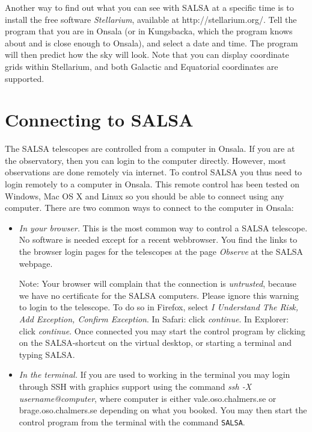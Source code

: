 Another way to find out what you can see with SALSA at a specific time is to
install the free software \emph{Stellarium}, available at
http://stellarium.org/.  Tell the program that you are in Onsala (or in
Kungsbacka, which the program knows about and is close enough to Onsala), and
select a date and time.  The program will then predict how the sky will look.
Note that you can display coordinate grids within Stellarium, and both Galactic
and Equatorial coordinates are supported.

\section{Connecting to SALSA} 
\label{sect:connect}
The SALSA telescopes are controlled from a computer in Onsala. If you are at
the observatory, then you can login to the computer directly. However, most
observations are done remotely via internet. To control SALSA you thus need to
login remotely to a computer in Onsala. This remote control has been tested
on Windows, Mac OS X and Linux so you should be able to connect using any 
computer. There are two common ways to connect to the computer in Onsala:

\begin{itemize}
	\item{\emph{In your browser.} This is the most common way to control a
			SALSA telescope. No software is needed except for a recent 
			webbrowser. You find the links to the browser login pages for
			the telescopes at the page \emph{Observe} at the SALSA webpage.
			
		Note: Your browser will complain that the connection is \emph{untrusted},
			because we have no certificate for the SALSA computers. Please
			ignore this warning to login to the telescope. To do so in Firefox,
			select \emph{I Understand The Risk, Add Exception, Confirm
			Exception}. In Safari: click \emph{continue}. In Explorer: click
			\emph{continue}.  Once connected you may start the control program by
			clicking on the SALSA-shortcut on the virtual desktop, or starting
		a terminal and typing SALSA. }

\item{\emph{In the terminal.} If you are used to working in the terminal you
		may login through SSH with graphics support using the command \emph{ssh
		-X username@computer}, where computer is either vale.oso.chalmers.se or
		brage.oso.chalmers.se depending on what you booked.  You may then start
		the control program from the terminal with the command {\tt  SALSA}.}
\end{itemize}

